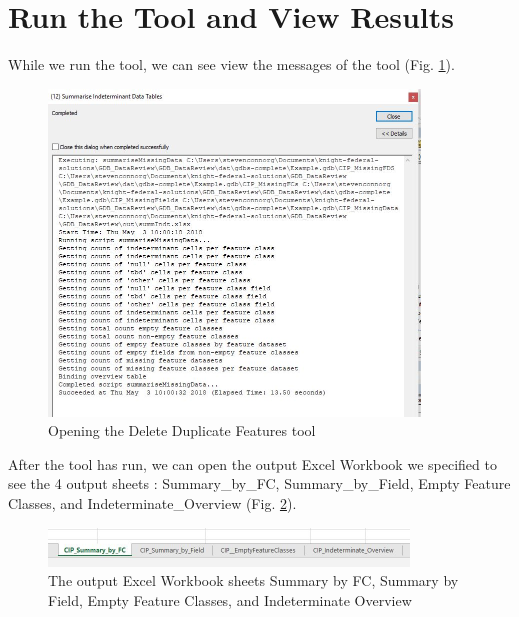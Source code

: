 \documentclass[openany]{book}
\theoremstyle{definition}
\theoremstyle{definition}
\theoremstyle{definition}
\theoremstyle{remark}
\begin{document}
\section{Run the Tool and View
Results}\label{run-the-tool-and-view-results-10}

While we run the tool, we can see view the messages of the tool (Fig.
\ref{fig:summIndtmessages}).

\begin{figure}[H]

{\centering \includegraphics[width=3.89in,]{figures/summIndt-messages} 

}

\caption{Opening the Delete Duplicate Features tool}\label{fig:summIndtmessages}
\end{figure}

After the tool has run, we can open the output Excel Workbook we
specified to see the 4 output sheets : Summary\_by\_FC,
Summary\_by\_Field, Empty Feature Classes, and Indeterminate\_Overview
(Fig. \ref{fig:summIndtsheets}).

\begin{figure}[H]

{\centering \includegraphics[width=3.77in,]{figures/summIndt-sheets} 

}

\caption{The output Excel Workbook sheets Summary by FC, Summary by Field, Empty Feature Classes, and Indeterminate Overview}\label{fig:summIndtsheets}
\end{figure}
\end{document}

